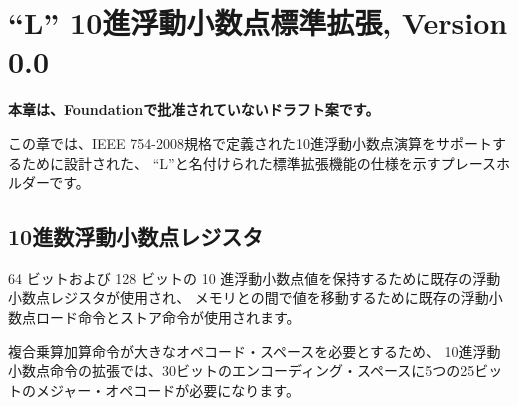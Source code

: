 \begin{comment}
\chapter{``L'' Standard Extension for Decimal Floating-Point, Version 0.0}
\end{comment}

\chapter{``L'' 10進浮動小数点標準拡張, Version 0.0}

\begin{comment}
{\bf This chapter is a draft proposal that has not been ratified by
  the Foundation.}
\end{comment}
{\bf 本章は、Foundationで批准されていないドラフト案です。}

\begin{comment}
This chapter is a placeholder for the specification of a standard
extension named ``L'' designed to support decimal floating-point
arithmetic as defined in the IEEE 754-2008 standard.
\end{comment}

この章では、IEEE 754-2008規格で定義された10進浮動小数点演算をサポートするために設計された、
``L''と名付けられた標準拡張機能の仕様を示すプレースホルダーです。

\begin{comment}
\section{Decimal Floating-Point Registers}
\end{comment}

\section{10進数浮動小数点レジスタ}

\begin{comment}
Existing floating-point registers are used to hold 64-bit and 128-bit
decimal floating-point values, and the existing floating-point load
and store instructions are used to move values to and from memory.
\end{comment}

64 ビットおよび 128 ビットの 10 進浮動小数点値を保持するために既存の浮動小数点レジスタが使用され、
メモリとの間で値を移動するために既存の浮動小数点ロード命令とストア命令が使用されます。

\begin{commentary}
\begin{comment}
Due to the large opcode space required by the fused multiply-add
instructions, the decimal floating-point instruction extension will
require five 25-bit major opcodes in a 30-bit encoding space.
\end{comment}
複合乗算加算命令が大きなオペコード・スペースを必要とするため、
10進浮動小数点命令の拡張では、30ビットのエンコーディング・スペースに5つの25ビットのメジャー・オペコードが必要になります。
\end{commentary}
